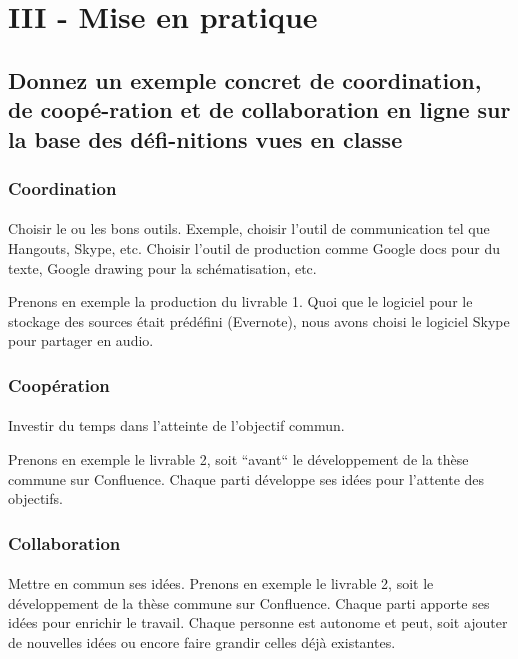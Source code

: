 \documentclass[12pt]{article}
\begin{document}
\newpage
\section{III - Mise en pratique}
\hrulefill

\subsection{Donnez un exemple concret de coordination, de coopé-ration et de collaboration en ligne sur la base des défi-nitions vues en classe}

\subsubsection{Coordination}
\paragraph{}
Choisir le ou les bons outils. Exemple, choisir l'outil de communication tel que Hangouts, Skype, etc. Choisir l'outil de production comme Google docs pour du texte, Google drawing pour la schématisation, etc.

Prenons en exemple la production du livrable 1. Quoi que le logiciel pour le stockage des sources était prédéfini (Evernote), nous avons choisi le logiciel Skype pour partager en audio.

\subsubsection{Coopération}
\paragraph{}
Investir du temps dans l'atteinte de l'objectif commun.

Prenons en exemple le livrable 2, soit ``avant`` le développement de la thèse commune sur Confluence. Chaque parti développe ses idées pour l'attente des objectifs.

\subsubsection{Collaboration}
\paragraph{}
Mettre en commun ses idées.
Prenons en exemple le livrable 2, soit le développement de la thèse commune sur Confluence. Chaque parti apporte ses idées pour enrichir le travail. Chaque personne est autonome et peut, soit ajouter de nouvelles idées ou encore faire grandir celles déjà existantes.
\end{document}
